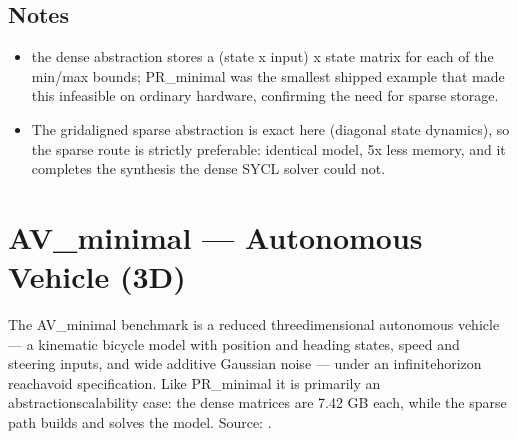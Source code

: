 \documentclass[a4paper,10pt,english]{sphinxmanual}
\begin{document}
\subsection{Notes}
\label{\detokenize{benchmarks/PR_minimal:notes}}\begin{itemize}
\item {} 
\sphinxAtStartPar
{} the dense abstraction stores a (state x input) x state matrix for
each of the min/max bounds; PR\_minimal was the smallest shipped example that made
this infeasible on ordinary hardware, confirming the need for sparse storage.

\item {} 
\sphinxAtStartPar
The grid\sphinxhyphen{}aligned sparse abstraction is exact here (diagonal state dynamics), so the
sparse route is strictly preferable: identical model, 5x less memory, and it
completes the synthesis the dense SYCL solver could not.

\end{itemize}

\sphinxstepscope


\section{AV\_minimal — Autonomous Vehicle (3D)}
\label{\detokenize{benchmarks/AV_minimal:av-minimal-autonomous-vehicle-3d}}\label{\detokenize{benchmarks/AV_minimal::doc}}
\sphinxAtStartPar
The AV\_minimal benchmark is a reduced three\sphinxhyphen{}dimensional autonomous vehicle — a
kinematic bicycle model with position and heading states, speed and steering inputs,
and wide additive Gaussian noise — under an infinite\sphinxhyphen{}horizon reach\sphinxhyphen{}avoid
specification. Like PR\_minimal it is primarily an abstraction\sphinxhyphen{}scalability case: the
dense matrices are 7.42 GB each, while the sparse path builds and solves the model.
Source: .
\end{document}
